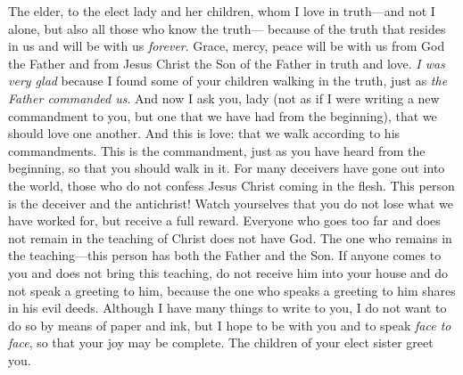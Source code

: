 
\begin{biblechapter} %
 The elder, to the elect lady and her children, whom I love in truth—and not I alone, but also all those who know the truth—
\verse because of the truth that resides in us and will be with us \textit{forever}.
\verse Grace, mercy, peace will be with us from God the Father and from Jesus Christ the Son of the Father in truth and love.
\verse \textit{I was very glad} because I found some of your children walking in the truth, just as \textit{the Father commanded us}.
 And now I ask you, lady (not as if I were writing a new commandment to you, but one that we have had from the beginning), that we should love one another.
\verse And this is love: that we walk according to his commandments. This is the commandment, just as you have heard from the beginning, so that you should walk in it.
\verse For many deceivers have gone out into the world, those who do not confess Jesus Christ coming in the flesh. This person is the deceiver and the antichrist!
\verse Watch yourselves that you do not lose what we have worked for, but receive a full reward.
\verse Everyone who goes too far and does not remain in the teaching of Christ does not have God. The one who remains in the teaching—this person has both the Father and the Son.
\verse If anyone comes to you and does not bring this teaching, do not receive him into your house and do not speak a greeting to him,
\verse because the one who speaks a greeting to him shares in his evil deeds.
 Although I have many things to write to you, I do not want to do so by means of paper and ink, but I hope to be with you and to speak \textit{face to face}, so that your joy may be complete.
\verse The children of your elect sister greet you.
\end{biblechapter}

